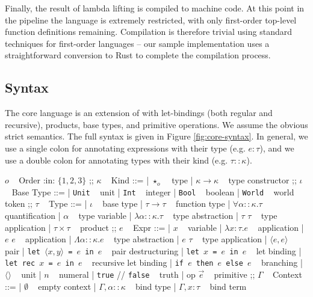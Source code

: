 \documentclass[runningheads]{llncs}
\begin{document}
Finally, the result of lambda lifting is compiled to machine code. At this point in the pipeline the language is extremely restricted, with only first-order top-level function definitions remaining. Compilation is therefore trivial using standard techniques for first-order languages -- our sample implementation uses a straightforward conversion to Rust \cite{klabnik2023rust} to complete the compilation process.

\subsection{Syntax}

The core language \core{} is an extension of \fom{} with let-bindings (both regular and recursive), products, base types, and primitive operations. We assume the obvious strict semantics. The full syntax is given in Figure \ref{fig:core-syntax}. In general, we use a single colon for annotating expressions with their type (e.g. $e : \tau$), and we use a double colon for annotating types with their kind (e.g. $\tau :: \kappa$).

\begin{figure*}[h]

  \begin{bnf}
    $o$ ~ \textsf{Order} :in: $\{1, 2, 3\}$
    ;;
    $\kappa$ ~ \textsf{Kind} ::=
    | $\star_o$ ~ type
    | $\kappa \rightarrow \kappa$ ~ type constructor
    ;;
    $\iota$ ~ \textsf{Base Type} ::=
    | \texttt{Unit} ~ unit
    | \texttt{Int} ~ integer
    | \texttt{Bool} ~ boolean
    | \texttt{World} ~ world token
    ;;
    $\tau$ ~ \textsf{Type} ::=
    | $\iota$ ~ base type
    | $\tau \rightarrow \tau$ ~ function type
    | $\forall \alpha :: \kappa. \tau$ ~ quantification
    | $\alpha$ ~ type variable
    | $\lambda \alpha :: \kappa. \tau$ ~ type abstraction
    | $\tau$ $\tau$ ~ type application
    | $\tau \times \tau$ ~ product
    ;;
    $e$ ~ \textsf{Expr} ::=
    | $x$ ~ variable
    | $\lambda x : \tau. e$ ~ application
    | $e$ $e$ ~ application
    | $\Lambda \alpha :: \kappa. e$ ~ type abstraction
    | $e$ $\tau$ ~ type application
    | $\langle e , e \rangle$ ~ pair
    | \texttt{let $\langle x , y \rangle$ = $e$ in $e$} ~ pair destructuring
    | \texttt{let $x$ = $e$ in $e$} ~ let binding
    | \texttt{let rec $x$ = $e$ in $e$} ~ recursive let binding
    | \texttt{if $e$ then $e$ else $e$} ~ branching
    | $\langle \rangle$ ~ unit
    | $n$ ~ numeral
    | \texttt{true} // \texttt{false} ~ truth
    | op $\overrightarrow e$ ~ primitive
    ;;
    $\Gamma$ ~ \textsf{Context} ::=
    | $\emptyset$ ~ empty context
    | $\Gamma , \alpha :: \kappa$ ~ bind type
    | $\Gamma , x : \tau$ ~ bind term
  \end{bnf}

  \caption{Syntax of the core language \core{}.}
  \label{fig:core-syntax}
\end{figure*}
\end{document}
